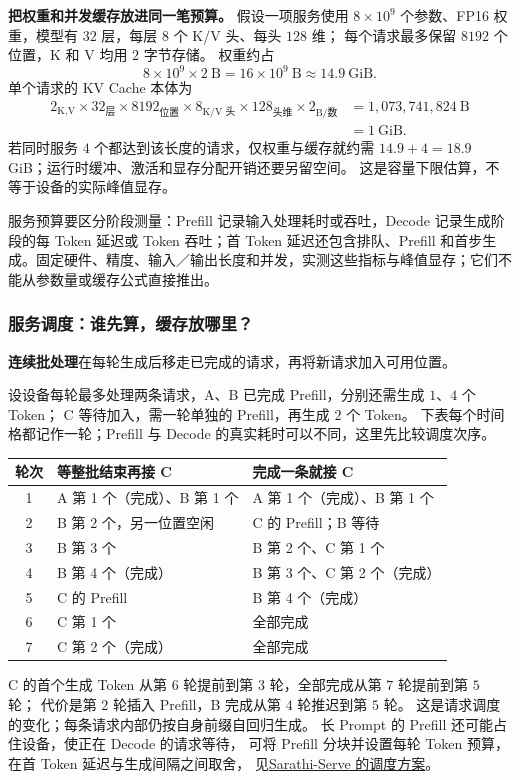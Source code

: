 \textbf{把权重和并发缓存放进同一笔预算。}
假设一项服务使用 $8\times10^9$ 个参数、FP16 权重，模型有 $32$ 层，每层 $8$ 个 K/V 头、每头 $128$ 维；
每个请求最多保留 $8192$ 个位置，K 和 V 均用 $2$ 字节存储。
权重约占
\[
8\times10^9\times2\ \text{B}=16\times10^9\ \text{B}\approx14.9\ \text{GiB}.
\]
单个请求的 KV Cache 本体为
\[
\begin{aligned}
2_{\text{K,V}}\times32_{\text{层}}\times8192_{\text{位置}}
\times8_{\text{K/V 头}}\times128_{\text{头维}}\times2_{\text{B/数}}
&=1{,}073{,}741{,}824\ \text{B}\\
&=1\ \text{GiB}.
\end{aligned}
\]
若同时服务 $4$ 个都达到该长度的请求，仅权重与缓存就约需 $14.9+4=18.9$ GiB；运行时缓冲、激活和显存分配开销还要另留空间。
这是容量下限估算，不等于设备的实际峰值显存。

服务预算要区分阶段测量：Prefill 记录输入处理耗时或吞吐，Decode 记录生成阶段的每 Token 延迟或 Token 吞吐；首 Token 延迟还包含排队、Prefill 和首步生成。固定硬件、精度、输入／输出长度和并发，实测这些指标与峰值显存；它们不能从参数量或缓存公式直接推出。

\subsubsection*{服务调度：谁先算，缓存放哪里？}
\label{concept:continuous-batching}%
\textbf{连续批处理}在每轮生成后移走已完成的请求，再将新请求加入可用位置。
\begin{samepage}
设设备每轮最多处理两条请求，A、B 已完成 Prefill，分别还需生成 $1$、$4$ 个 Token；
C 等待加入，需一轮单独的 Prefill，再生成 $2$ 个 Token。
下表每个时间格都记作一轮；Prefill 与 Decode 的真实耗时可以不同，这里先比较调度次序。
\begin{center}\small
{}
\begin{tabularx}{\linewidth}{@{}cXX@{}}
\toprule
轮次 & 等整批结束再接 C & 完成一条就接 C\\\midrule
1 & A 第 1 个（完成）、B 第 1 个 & A 第 1 个（完成）、B 第 1 个\\
2 & B 第 2 个，另一位置空闲 & C 的 Prefill；B 等待\\
3 & B 第 3 个 & B 第 2 个、C 第 1 个\\
4 & B 第 4 个（完成） & B 第 3 个、C 第 2 个（完成）\\
5 & C 的 Prefill & B 第 4 个（完成）\\
6 & C 第 1 个 & 全部完成\\
7 & C 第 2 个（完成） & 全部完成\\
\bottomrule
\end{tabularx}
\end{center}
\end{samepage}
C 的首个生成 Token 从第 $6$ 轮提前到第 $3$ 轮，全部完成从第 $7$ 轮提前到第 $5$ 轮；
代价是第 $2$ 轮插入 Prefill，B 完成从第 $4$ 轮推迟到第 $5$ 轮。
这是请求调度的变化；每条请求内部仍按自身前缀自回归生成。
长 Prompt 的 Prefill 还可能占住设备，使正在 Decode 的请求等待，
可将 Prefill 分块并设置每轮 Token 预算，在首 Token 延迟与生成间隔之间取舍，
见\hyperref[source:sarathi-serve]{Sarathi-Serve 的调度方案}。

